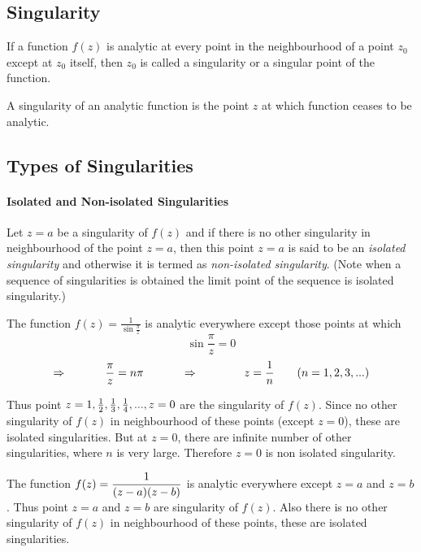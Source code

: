 \subsection{Singularity}
\begin{definition}
If a function $f(z)$ is analytic at every point in the neighbourhood of a point $z_0$ except at $z_0$ itself, then $z_0$ is called a singularity or a singular point of the function.
\end{definition}
A singularity of an analytic function is the point $z$ at which function ceases to be analytic. 
 \subsection{Types of Singularities}
 \paragraph{Isolated and Non-isolated Singularities}
Let $z=a$ be a singularity of $f(z)$ and if there is no other  singularity in neighbourhood of the point $z=a$, then this point $z=a$ is said to be an \textit{isolated singularity} and otherwise it is termed as \textit{non-isolated singularity}. (Note when a sequence of singularities is obtained the limit point of the sequence is isolated singularity.)
\begin{example}
The function $f(z) = \frac{1}{\sin \frac{\pi}{z}}$ is analytic everywhere except those points at which \[\sin \frac{\pi}{z} = 0\]
\[\Rightarrow~~~~~~~~~~{\pi \over z} = n \pi ~~~~~~~~~~\Rightarrow~~~~~~~~~~~~ z = {1 \over n} ~~~~~~(n = 1, 2, 3, ...)\]

 Thus point $z= 1, {1 \over 2}, {1 \over 3}, {1 \over 4}, ..., z=0$ are the singularity of $f(z)$. Since no other singularity of $f(z)$ in neighbourhood of these points (except $z=0$), these are isolated singularities. But at $z=0$, there are infinite number of other singularities, where $n$ is very large. Therefore $z=0$ is non isolated singularity.
\end{example}
\begin{example}
The function $\displaystyle f(z) = \frac{1}{(z-a)(z-b)}$ is analytic everywhere except $z=a$ and $z=b$. Thus point $z= a$ and $z=b$ are singularity of $f(z)$. Also there is no other singularity of $f(z)$ in neighbourhood of these points, these are isolated singularities.
\end{example}
